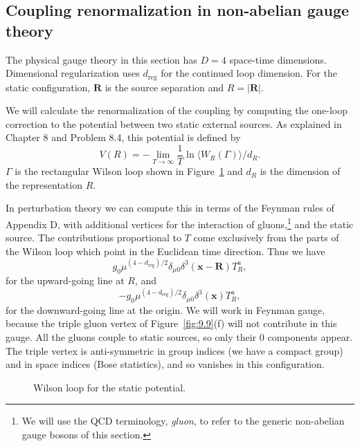 \subsection{Coupling renormalization in non-abelian gauge theory}

The physical gauge theory in this section has $D=4$ space-time dimensions.
Dimensional regularization uses $d_{\mathrm{reg}}$ for the continued loop
dimension.  For the static configuration, $\mathbf R$ is the source
separation and $R=|\mathbf R|$.

We will calculate the renormalization of the coupling by computing the one-loop
correction to the potential between two static external sources. As explained
in Chapter 8 and Problem 8.4, this potential is defined by
\begin{equation}
  V(R)=-\lim_{T\to\infty}\frac{1}{T}\ln\langle W_R(\Gamma)\rangle/d_R.
  \label{eq:9.2}
\end{equation}
$\Gamma$ is the rectangular Wilson loop shown in Figure~\ref{fig:9.8} and
$d_R$ is the dimension of the representation $R$.

In perturbation theory we can compute this in terms of the Feynman rules of
Appendix D, with additional vertices for the interaction of gluons,\footnote[16]{We
will use the QCD terminology, \emph{gluon}, to refer to the generic non-abelian
gauge bosons of this section.} and the static source. The contributions
proportional to $T$ come exclusively from the parts of the Wilson loop which
point in the Euclidean time direction. Thus we have
\[
  g_0\mu^{(4-d_{\mathrm{reg}})/2}\delta_{\mu0}
  \delta^3(\mathbf x-\mathbf R)T_R^a,
\]
for the upward-going line at $R$, and
\[
  -g_0\mu^{(4-d_{\mathrm{reg}})/2}\delta_{\mu0}
  \delta^3(\mathbf x)T_R^a,
\]
for the downward-going line at the origin. We will work in Feynman gauge,
because the triple gluon vertex of Figure~\ref{fig:9.9}(f) will not contribute
in this gauge. All the gluons couple to static sources, so only their $0$
components appear. The triple vertex is anti-symmetric in group indices (we
have a compact group) and in space indices (Bose statistics), and so vanishes
in this configuration.

\begin{figure}[htbp]
  \centering
  
  \caption{Wilson loop for the static potential.}
  \label{fig:9.8}
\end{figure}

